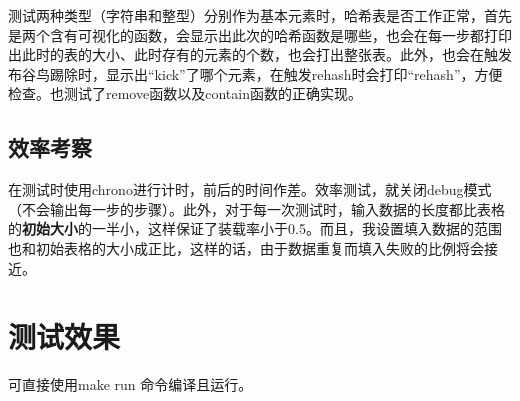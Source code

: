 \documentclass[UTF8]{ctexart}
\begin{document}
测试两种类型（字符串和整型）分别作为基本元素时，哈希表是否工作正常，首先是两个含有可视化的函数，会显示出此次的哈希函数是哪些，也会在每一步都打印出此时的表的大小、此时存有的元素的个数，也会打出整张表。此外，也会在触发布谷鸟踢除时，显示出“kick”了哪个元素，在触发rehash时会打印“rehash”，方便检查。也测试了remove函数以及contain函数的正确实现。

\subsection{效率考察}

在测试时使用chrono进行计时，前后的时间作差。效率测试，就关闭debug模式（不会输出每一步的步骤）。此外，对于每一次测试时，输入数据的长度都比表格的\textbf{初始大小}的一半小，这样保证了装载率小于0.5。而且，我设置填入数据的范围也和初始表格的大小成正比，这样的话，由于数据重复而填入失败的比例将会接近。

\section{测试效果}

可直接使用make run 命令编译且运行。
\end{document}
